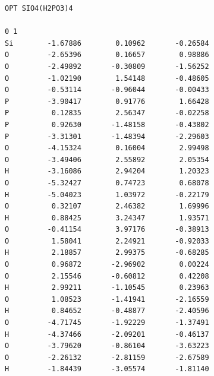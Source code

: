 \documentclass[
  printed, %
  table,   %
  lof,     %
  lot,     %
  oneside,
]{fithesis3}
\begin{document}
\begin{lstlisting}[frame=single, caption={\ce{SiO4(H2PO3)4}},label=DescriptiveLabel]
OPT SIO4(H2PO3)4

0 1
Si        -1.67886        0.10962       -0.26584
O         -2.65396        0.16657        0.98886
O         -2.49892       -0.30809       -1.56252
O         -1.02190        1.54148       -0.48605
O         -0.53114       -0.96044       -0.00433
P         -3.90417        0.91776        1.66428
P          0.12835        2.56347       -0.02258
P          0.92630       -1.48158       -0.43802
P         -3.31301       -1.48394       -2.29603
O         -4.15324        0.16004        2.99498
O         -3.49406        2.55892        2.05354
H         -3.16086        2.94204        1.20323
O         -5.32427        0.74723        0.68078
H         -5.04023        1.03972       -0.22179
O          0.32107        2.46382        1.69996
H          0.88425        3.24347        1.93571
O         -0.41154        3.97176       -0.38913
O          1.58041        2.24921       -0.92033
H          2.18857        2.99375       -0.68285
O          0.96872       -2.96902        0.00224
O          2.15546       -0.60812        0.42208
H          2.99211       -1.10545        0.23963
O          1.08523       -1.41941       -2.16559
H          0.84652       -0.48877       -2.40596
O         -4.71745       -1.92229       -1.37491
H         -4.37466       -2.09201       -0.46137
O         -3.79620       -0.86104       -3.63223
O         -2.26132       -2.81159       -2.67589
H         -1.84439       -3.05574       -1.81140
 \end{lstlisting}
\newpage
\end{document}
